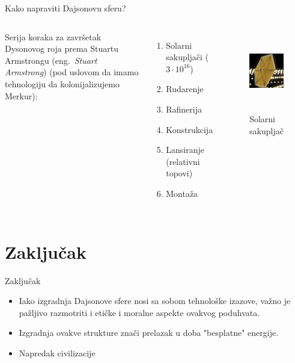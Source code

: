 \documentclass[13pt]{beamer}
\begin{document}
\begin{frame}{Kako napraviti Dajsonovu sferu?}

\begin{columns}
            Serija koraka za završetak Dysonovog roja prema Stuartu Armstrongu (eng.~{\em Stuart Armstrong}) (pod uslovom da imamo tehnologiju da kolonijalizujemo Merkur):
        \begin{enumerate}
            \item Solarni sakupljači ($3 \cdot 10^{16}$)
            \item Rudarenje
            \item Rafinerija
            \item Konstrukcija
            \item Lansiranje (relativni topovi)
            \item Montaža
        \end{enumerate}
        \begin{figure}
            \centering
            \includegraphics[width=4cm, height=3.5cm]{images/solarni kolektori.png}
            \caption{Solarni sakupljač}
            \label{fig:enter-label}
        \end{figure}
\end{columns}

\end{frame}



\section{Zaključak}

\begin{frame}{Zaključak}

\begin{itemize}
    \item Iako izgradnja Dajsonove sfere nosi sa sobom tehnološke izazove, važno je pažljivo razmotriti i etičke i moralne aspekte ovakvog poduhvata.
    \item Izgradnja ovakve strukture znači prelazak u doba "besplatne" energije.
    \item Napredak civilizacije
\end{itemize}

\end{frame}
\end{document}
